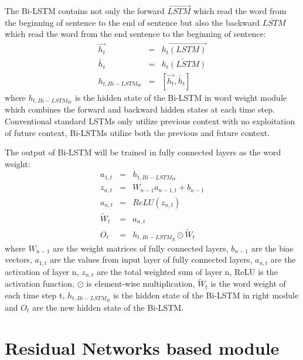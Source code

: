 \documentclass[senior]{IPSstyle}
\begin{document}
The Bi-LSTM contains not only the forward $\overrightarrow{LSTM}$ which read the word from the beginning of sentence to the end of sentence but also the backward $\overleftarrow{LSTM}$ which read the word from the end sentence to the beginning of sentence:%
\begin{eqnarray}
\overrightarrow{h_t} &=& \overrightarrow{h_t(LSTM)} \\
\overleftarrow{h_t} &=& \overleftarrow{h_t(LSTM)} \\
h_{t,Bi-LSTM_W} &=& [\overrightarrow{h_t}, \overleftarrow{h_t}]
\end{eqnarray}
where $h_{t,Bi-LSTM_W}$ is the hidden state of the Bi-LSTM in word weight module which combines the forward and backward hidden states at each time step. Conventional standard LSTMs only utilize previous context with no exploitation of future context, Bi-LSTMs utilize both the previous and future context.

The output of Bi-LSTM will be trained in fully connected layers as the word weight:
\begin{eqnarray}
a_{1,t} &=& h_{t,Bi-LSTM_W} \\
z_{n,t} &=& W_{n-1}a_{n-1,t} + b_{n-1} \\
a_{n,t} &=& ReLU(z_{n,t}) \\
\tilde{W}_t &=& a_{n,t} \\
O_t &=& h_{t,Bi-LSTM_R} \odot \tilde{W}_t
\end{eqnarray}
where $W_{n-1}$ are the weight matrices of fully connected layers, $b_{n-1}$ are the bias vectors, $a_{1,t}$ are the values from input layer of fully connected layers, $a_{n,t}$ are the activation of layer n, $z_{n,t}$ are the total weighted sum of layer n, ReLU\cite{nair2010rectified} is the activation function, $\odot$ is element-wise multiplication, $\tilde{W}_t$ is the word weight of each time step t, $h_{t,Bi-LSTM_R}$ is the hidden state of the Bi-LSTM in right module and $O_t$ are the new hidden state of the Bi-LSTM.\\





\section{Residual Networks based module}
\end{document}

